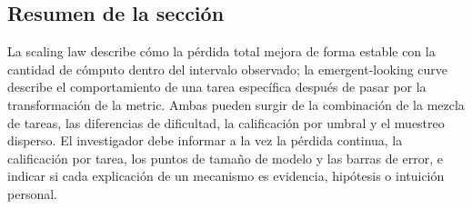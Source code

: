 
\subsection{Resumen de la sección}

La scaling law describe cómo la pérdida total mejora de forma estable con la cantidad de cómputo dentro del intervalo observado; la emergent-looking curve describe el comportamiento de una tarea específica después de pasar por la transformación de la metric. Ambas pueden surgir de la combinación de la mezcla de tareas, las diferencias de dificultad, la calificación por umbral y el muestreo disperso. El investigador debe informar a la vez la pérdida continua, la calificación por tarea, los puntos de tamaño de modelo y las barras de error, e indicar si cada explicación de un mecanismo es evidencia, hipótesis o intuición personal.
